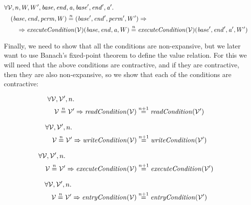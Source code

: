\documentclass[a4paper]{article}
\newcommand{\nequal}[1][n]{\stackrel{\tiny{#1}}{=}}
\newcommand{\var}[1]{\mathit{#1}}
\newcommand{\addr}{\var{a}}
\newcommand{\start}{\var{base}}
\newcommand{\addrend}{\var{end}}
\newcommand{\perm}{\var{perm}}
\newcommand{\plainfun}[2]{
  \ifthenelse{\equal{#2}{}}
             {\mathit{#1}}
             {\mathit{#1}(#2)}
}
\newcommand{\readCond}[1]{\plainfun{readCondition}{#1}}
\newcommand{\writeCond}[1]{\plainfun{writeCondition}{#1}}
\newcommand{\execCond}[1]{\plainfun{executeCondition}{#1}}
\newcommand{\entryCond}[1]{\plainfun{entryCondition}{#1}}
\newcommand{\asmType}{\plaindom{AsmType}}
\newcommand{\plaindom}[1]{\mathrm{#1}}
\newcommand{\intr}[2]{\mathcal{#1}}
\newcommand{\valueintr}[1]{\intr{V}{#1}}
\newcommand{\stdvr}{\valueintr{\asmType}}
\begin{document}
\begin{lemma}
\label{lem:en-ne-world}
  \begin{align*}
    &\forall \stdvr,n, W, W',\start,\addrend,\addr, \start', \addrend', \addr' \ldotp \\
    &\quad (\start,\addrend,\perm,W) \nequal (\start',\addrend',\perm',W') \Rightarrow \\
    &\qquad \Rightarrow \execCond{}(\stdvr)(\start,\addrend,\addr,W) \nequal \execCond{}(\stdvr)(\start',\addrend',\addr',W')
  \end{align*}
\end{lemma}
Finally, we need to show that all the conditions are non-expansive, but we later want to use Banach's fixed-point theorem to define the value relation. For this we will need that the above conditions are contractive, and if they are contractive, then they are also non-expansive, so we show that each of the conditions are contractive:
\begin{lemma}
  \label{lem:rc-con}
  \begin{align*}
    &\forall \stdvr, \stdvr', n \ldotp \\
    &\quad \stdvr \nequal \stdvr' \Rightarrow \readCond{}(\stdvr) \nequal[n+1] \readCond{}(\stdvr')
  \end{align*}
\end{lemma}

\begin{lemma}
  \label{lem:wc-con}
  \begin{align*}
    &\forall \stdvr, \stdvr', n \ldotp \\
    &\quad \stdvr \nequal \stdvr' \Rightarrow \writeCond{}(\stdvr) \nequal[n+1] \writeCond{}(\stdvr')
  \end{align*}
\end{lemma}

\begin{lemma}
  \label{lem:ec-con}
  \begin{align*}
    &\forall \stdvr, \stdvr', n \ldotp \\
    &\quad \stdvr \nequal \stdvr' \Rightarrow \execCond{}(\stdvr) \nequal[n+1] \execCond{}(\stdvr')
  \end{align*}
\end{lemma}

\begin{lemma}
  \label{lem:en-con}
  \begin{align*}
    &\forall \stdvr, \stdvr', n \ldotp \\
    &\quad \stdvr \nequal \stdvr' \Rightarrow \entryCond{}(\stdvr) \nequal[n+1] \entryCond{}(\stdvr')
  \end{align*}
\end{lemma}
\end{document}
